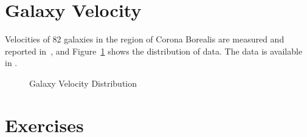 \section[Galaxy Velocity]{Galaxy Velocity}
\label{sec:galaxy}

Velocities of 82 galaxies in the region of Corona Borealis are
measured and reported in~\citep{Roeder1990}, and Figure~\ref{fig:galaxy}
shows the distribution of data. The data is available in .
\begin{figure}[ht]
\centering
\caption{Galaxy Velocity Distribution}
\label{fig:galaxy}
\end{figure}








\section{Exercises}
\label{sec:mle_exercise}

